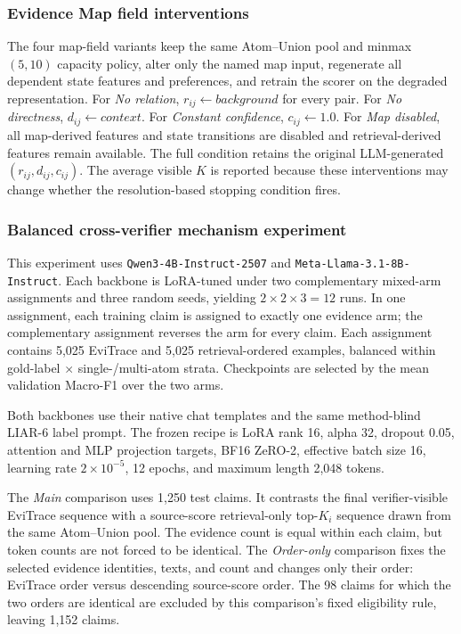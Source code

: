 \subsubsection{Evidence Map field interventions}

The four map-field variants keep the same Atom--Union pool and
minmax\((5,10)\) capacity policy, alter only the named map input, regenerate
all dependent state features and preferences, and retrain the scorer on the
degraded representation.  For \emph{No relation},
\(r_{ij}\leftarrow\textit{background}\) for every pair.  For
\emph{No directness}, \(d_{ij}\leftarrow\textit{context}\).  For
\emph{Constant confidence}, \(c_{ij}\leftarrow1.0\).  For
\emph{Map disabled}, all map-derived features and state transitions are
disabled and retrieval-derived features remain available.  The full
condition retains the original LLM-generated
\((r_{ij},d_{ij},c_{ij})\).  The average visible \(K\) is reported because
these interventions may change whether the resolution-based stopping
condition fires.

\subsubsection{Balanced cross-verifier mechanism experiment}
\label{sec:supp-cross-verifier}

This experiment uses
\texttt{Qwen3-4B-Instruct-2507} and
\texttt{Meta-Llama-3.1-8B-Instruct}.  Each backbone is LoRA-tuned under two
complementary mixed-arm assignments and three random seeds, yielding
\(2\times2\times3=12\) runs.  In one assignment, each training claim is
assigned to exactly one evidence arm; the complementary assignment reverses
the arm for every claim.  Each assignment contains 5,025 EviTrace and 5,025
retrieval-ordered examples, balanced within
gold-label \(\times\) single-/multi-atom strata.  Checkpoints are selected
by the mean validation Macro-F1 over the two arms.

Both backbones use their native chat templates and the same method-blind
LIAR-6 label prompt.  The frozen recipe is LoRA rank 16, alpha 32, dropout
0.05, attention and MLP projection targets, BF16 ZeRO-2, effective batch
size 16, learning rate \(2\times10^{-5}\), 12 epochs, and maximum length
2,048 tokens.

The \emph{Main} comparison uses 1,250 test claims.  It contrasts the final
verifier-visible EviTrace sequence with a source-score retrieval-only
top-\(K_i\) sequence drawn from the same Atom--Union pool.  The evidence
count is equal within each claim, but token counts are not forced to be
identical.  The \emph{Order-only} comparison fixes the selected evidence
identities, texts, and count and changes only their order: EviTrace order
versus descending source-score order.  The 98 claims for which the two
orders are identical are excluded by this comparison's fixed eligibility
rule, leaving 1,152 claims.

